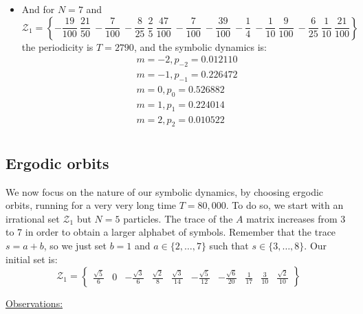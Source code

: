 \begin{itemize}
\item
And for $N = 7$ and
\[
\mathcal{Z}_1 =
\left\{ - \frac{19}{100} ~ \frac{21}{50} ~ -
\frac{7}{100} ~ - \frac{8}{25} ~ \frac{2}{5} ~ \frac{47}{100} ~ -
\frac{7}{100} ~ - \frac{39}{100} ~ - \frac{1}{4} ~ - \frac{1}{10} ~
\frac{9}{100} ~ - \frac{6}{25} ~ \frac{1}{10} ~ \frac{21}{100}
\right\}
\]
the periodicity is $T = 2790$, and the symbolic dynamics is:
\[
\begin{array}{c}
m = -2, p_{-2} = 0.012110 \\
m = -1, p_{-1} = 0.226472 \\
m = 0, p_{0} = 0.526882 \\
m = 1, p_{1} = 0.224014 \\
m = 2, p_{2} = 0.010522 \\
\end{array}
\]

\end{itemize}


\subsection{Ergodic orbits}

We now focus on the nature of our symbolic dynamics, by choosing ergodic orbits, running for a very very long time $T = 80,000$. To do so, we start with an irrational set $\mathcal{Z}_1$ but $N = 5$ particles. The trace of the $A$ matrix increases from 3 to 7 in order to obtain a larger alphabet of symbols. Remember that the trace $s = a+b$, so we just set $b = 1$ and $a \in \{2, \dots, 7\}$ such that $s \in \{3, \dots, 8\}$. Our initial set is:
\[
\mathcal{Z}_1 = \left\{\begin{array}{cccccccccc} \frac{\sqrt{5}}{6} & 0 & -\frac{\sqrt{3}}{6}  & \frac{\sqrt{2}}{8}  & \frac{\sqrt{3}}{14}  & - \frac{\sqrt{5}}{12}  & -\frac{\sqrt{6}}{20}  & \frac{1}{17}  & \frac{3}{10}  & \frac{\sqrt{2}}{10}   \end{array}\right\}
\]

\underline{Observations:}

